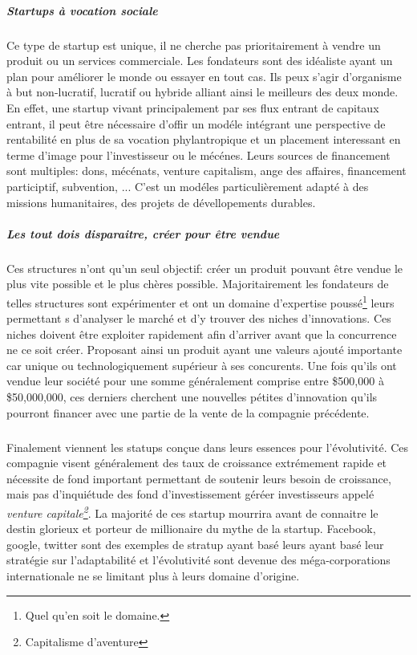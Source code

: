 \documentclass[11pt, a4paper ]{article}
\begin{document}
\begin{spacing}{1.5}
			\subparagraph{Startups à vocation sociale} %
Ce type de startup est unique, il ne cherche pas prioritairement à vendre un produit ou un services commerciale. Les fondateurs sont des idéaliste ayant un plan pour améliorer le monde ou essayer en tout cas. 
Ils peux s'agir d'organisme à but non-lucratif, lucratif ou hybride alliant ainsi le meilleurs des deux monde. 
En effet, une startup vivant principalement par ses flux entrant de capitaux entrant, il peut être nécessaire d'offir un modéle intégrant une perspective de rentabilité en plus de sa vocation phylantropique et un placement interessant en terme d'image pour l'investisseur ou le mécénes. Leurs sources de financement sont  multiples: dons, mécénats, venture capitalism, ange des affaires, financement participtif, subvention, ...
C'est un modéles particulièrement adapté à des missions humanitaires, des projets de dévellopements durables. 


			\subparagraph{Les \emph{tout dois disparaitre}, créer pour être vendue} %
Ces structures n'ont qu'un seul objectif: créer un produit pouvant être vendue le plus vite possible et le plus chères possible. Majoritairement les fondateurs de telles structures sont expérimenter et ont un domaine d'expertise poussé\footnote{Quel qu'en soit le domaine.} leurs permettant s d'analyser le marché et d'y trouver des niches d'innovations. Ces niches doivent être exploiter rapidement afin d'arriver avant que la concurrence ne ce soit créer. Proposant ainsi un produit ayant une valeurs ajouté importante car unique ou technologiquement supérieur à ses concurents. Une fois qu'ils ont vendue leur société pour une somme généralement comprise entre \$500,000 à \$50,000,000, ces derniers cherchent une nouvelles pétites d'innovation qu'ils pourront financer avec une partie de la vente de la compagnie précédente. 

			\subparagraph{} %
Finalement viennent les statups conçue dans leurs essences pour l'évolutivité. Ces compagnie visent généralement des taux de croissance extrémement rapide et nécessite de fond important permettant de soutenir leurs besoin de croissance, mais pas d'inquiétude des fond d'investissement géréer investisseurs appelé \emph{venture capitale\footnote{Capitalisme d'aventure}}. La majorité de ces startup mourrira avant de connaitre le destin glorieux et porteur de millionaire du mythe de la startup. Facebook, google, twitter sont des exemples de stratup ayant basé leurs ayant basé leur stratégie sur l'adaptabilité et l'évolutivité sont devenue des méga-corporations internationale ne se limitant plus à leurs domaine d'origine.


\end{spacing}
\end{document}
